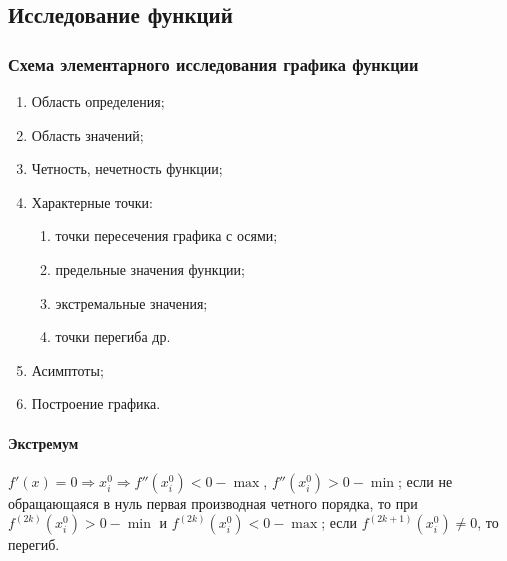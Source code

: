 		\newpage

	\subsection*{Исследование функций}

	    \subsubsection*{Схема элементарного исследования графика функции}

	        \begin{enumerate}
	        	\item Область определения;

	        	\item Область значений;

	        	\item Четность, нечетность функции;

	        	\item Характерные точки:

	        	\begin{enumerate}
	        		\item точки пересечения графика с осями;

	        		\item предельные значения функции;

	        		\item экстремальные значения;

	        		\item точки перегиба др.
	        	\end{enumerate}

	        	\item Асимптоты;

	        	\item Построение графика.
	        \end{enumerate}

			\paragraph{Экстремум}

			    $f' (x) = 0 \Rightarrow x^{0}_{i} \Rightarrow f'' (x^{0}_{i}) < 0 - \max$, $f'' (x^{0}_{i}) > 0 - \min$; если не обращающаяся в нуль первая производная четного порядка, то при $f^{(2 k)} (x^{0}_{i}) > 0 - \min$ и $f^{(2 k)} (x^{0}_{i}) < 0 - \max$; если $f^{(2 k + 1)} (x^{0}_{i}) \neq 0$, то перегиб.

